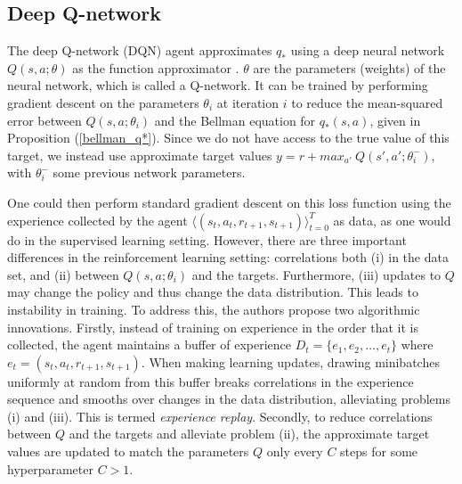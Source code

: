 \documentclass[11pt, a4paper, bibliography=totoc]{report}
\begin{document}
\subsection{Deep Q-network} \label{DQN}
The deep Q-network (DQN) agent approximates $ q_* $ using a deep neural network $ Q(s,a; \theta) $ as the function approximator \cite{Mnih2015}. $ \theta $ are the parameters (weights) of the neural network, which is called a Q-network. It can be trained by performing gradient descent on the parameters $ \theta_i $ at iteration $ i $ to reduce the mean-squared error between $ Q(s,a; \theta_i) $ and the Bellman equation for $ q_*(s,a) $, given in Proposition (\ref{bellman_q*}). Since we do not have access to the true value of this target, we instead use approximate target values $ y = r + max_{a'} ~ Q(s', a' ; \theta_i^-) $, with $ \theta_i^- $ some previous network parameters.

One could then perform standard gradient descent on this loss function using the experience collected by the agent $\langle (s_t, a_t, r_{t+1}, s_{t+1}) \rangle_{t=0}^T $ as data, as one would do in the supervised learning setting. However, there are three important differences in the reinforcement learning setting: correlations both (i) in the data set, and (ii) between $ Q(s,a ; \theta_i) $ and the targets. Furthermore, (iii) updates to $ Q $ may change the policy and thus change the data distribution. This leads to instability in training. To address this, the authors propose two algorithmic innovations. Firstly, instead of training on experience in the order that it is collected, the agent maintains a buffer of experience $ D_t = \{ e_1, e_2, \dots, e_t \} $ where $ e_t = (s_t, a_t, r_{t+1}, s_{t+1}) $. When making learning updates, drawing minibatches uniformly at random from this buffer breaks correlations in the experience sequence and smooths over changes in the data distribution, alleviating problems (i) and (iii). This is termed \textit{experience replay}. Secondly, to reduce correlations between $ Q $ and the targets and alleviate problem (ii), the approximate target values are updated to match the parameters $ Q $ only every $ C $ steps for some hyperparameter $ C > 1 $.
\end{document}
